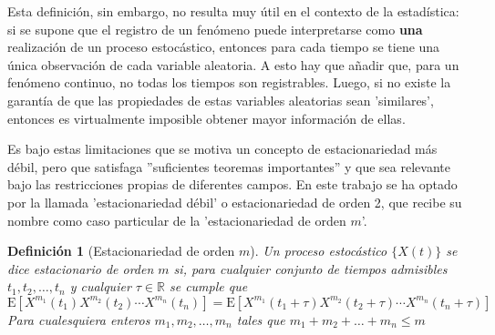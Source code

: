 \documentclass[12pt,a4paper]{mitthesis}
\newtheorem{defn}{Definici\'on}
\newcommand{\R}{\mathbb{R}}
\newcommand{\E}[1]{\mathrm{E}\left[ #1 \right]}
\begin{document}
Esta definici\'on, sin embargo, no resulta muy \'util en el contexto de la estad\'istica: si se 
supone que el registro de un fen\'omeno puede interpretarse como \textbf{una} realizaci\'on de un 
proceso estoc\'astico, entonces para cada tiempo se tiene una \'unica observaci\'on de cada 
variable aleatoria. A esto hay que a\~nadir que, para un fen\'omeno continuo, no todas los tiempos 
son registrables.
Luego, si no existe la garant\'ia de que las propiedades de estas variables aleatorias sean 
'similares', entonces es virtualmente imposible obtener mayor informaci\'on de ellas.

Es bajo estas limitaciones que se motiva un concepto de estacionariedad m\'as d\'ebil, pero que
satisfaga ''suficientes teoremas importantes'' y que sea relevante bajo las restricciones propias 
de diferentes campos. En este trabajo se ha optado por la llamada 'estacionariedad d\'ebil' o 
estacionariedad de orden 2, que recibe su nombre como caso particular de la 'estacionariedad de 
orden $m$'.

\begin{defn}[Estacionariedad de orden $m$]
Un proceso estoc\'astico $\{ X(t) \}$ se dice estacionario de orden $m$ si, para cualquier conjunto 
de tiempos admisibles $t_1,t_2,\dots,t_n$ y cualquier $\tau \in \R$ se cumple que
\begin{equation*}
\E{ X^{m_1}(t_1)X^{m_2}(t_2)\cdots X^{m_n}(t_n) }
=
\E{ X^{m_1}(t_1+\tau)X^{m_2}(t_2+\tau)\cdots X^{m_n}(t_n+\tau) }
\end{equation*}
Para cualesquiera enteros $m_1,m_2,\dots,m_n$ tales que $m_1+m_2+\dots+m_n \leq m$
\label{est_orden_m}
\end{defn}
\end{document}
